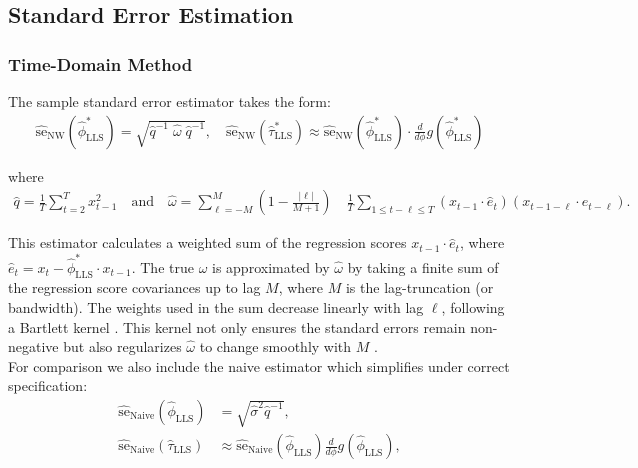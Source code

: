 \documentclass[docs/main.tex]{subfiles}
\begin{document}
\subsection{Standard Error Estimation}
\subsubsection{Time-Domain Method}\label{sec:stderr-time-domain_}
The sample standard error estimator takes the form:
\begin{align}\label{eq:stderr-time-domain_}
\widehat{\text{se}}_{\text{NW}}(\hat\phi^*_{\scriptscriptstyle\text{LLS}}) = \sqrt{\hat q^{-1}\;\hat\omega\; \hat q^{-1}}, \quad
\widehat{\text{se}}_{\text{NW}}(\hat\tau^*_{\scriptscriptstyle\text{LLS}}) \approx \widehat{\text{se}}_{\text{NW}}(\hat\phi^*_{\scriptscriptstyle\text{LLS}}) \cdot \frac{d}{d\phi} g(\hat\phi^*_{\scriptscriptstyle\text{LLS}})
\end{align}

\noindent where
\begin{align}\label{eq:lls_q_omega_}
    \hat q = \frac{1}{T} \sum_{t=2}^T x_{t-1}^2 \quad\text{and}\quad
    \hat \omega = \sum_{\ell=-M}^M \left(1 - \frac{|\ell|}{M+1}\right) \quad \frac{1}{T} \sum_{1\le t - \ell \le T} (x_{t-1} \cdot \hat e_t)(x_{t-1-\ell} \cdot \hat e_{t-\ell}).
\end{align}

\noindent This estimator calculates a weighted sum of the regression scores $x_{t-1} \cdot \hat e_t$, where $\hat e_t = x_t - \hat\phi^*_{\scriptscriptstyle\text{LLS}} \cdot x_{t-1}$. The true $\omega$ is approximated by $\hat \omega$ by taking a finite sum of the regression score covariances up to lag $M$, where $M$ is the lag-truncation (or bandwidth). The weights used in the sum decrease linearly with lag $\ell$, following a Bartlett kernel \citep{newey_simple_1987}. This kernel not only ensures the standard errors remain non-negative but also regularizes $\hat \omega$ to change smoothly with $M$ \citep[Chapter~14.35]{hansen_econometrics_2022}.\\

\noindent For comparison we also include the naive estimator which simplifies under correct specification:
\begin{align}
    \widehat{\text{se}}_\text{Naive}(\hat\phi_{\scriptscriptstyle\text{LLS}}) &= \sqrt{\hat\sigma^2 \hat q^{-1}},\\
    \widehat{\text{se}}_\text{Naive}(\hat\tau_{\scriptscriptstyle\text{LLS}}) &\approx \widehat{\text{se}}_{\text{Naive}}(\hat\phi_{\scriptscriptstyle\text{LLS}}) \frac{d}{d\phi} g(\hat\phi_{\scriptscriptstyle\text{LLS}}),
\end{align}
\end{document}
